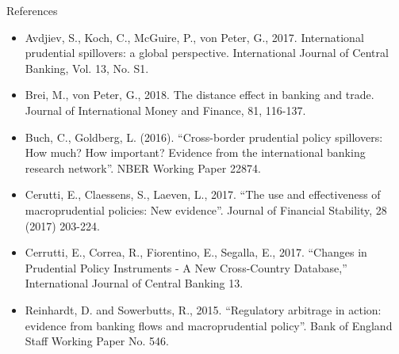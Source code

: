 \documentclass{beamer}
\begin{document}
\begin{frame}{References}
\begin{itemize}
\item Avdjiev, S., Koch, C., McGuire, P., von Peter, G., 2017. International prudential spillovers: a global perspective. International Journal of Central Banking, Vol. 13, No. S1.
\item Brei, M., von Peter, G., 2018. The distance effect in banking and trade. Journal of International Money and Finance, 81, 116-137.
\item Buch, C., Goldberg, L. (2016). “Cross-border prudential policy spillovers: How much? How important? Evidence from the international banking research network”. NBER Working Paper 22874.
\item Cerutti, E., Claessens, S., Laeven, L., 2017. “The use and effectiveness of macroprudential policies: New evidence”. Journal of Financial Stability, 28 (2017) 203-224.
\item Cerrutti, E., Correa, R., Fiorentino, E., Segalla, E., 2017. “Changes in Prudential Policy Instruments - A New Cross-Country Database,” International Journal of Central Banking 13.
\item Reinhardt, D. and Sowerbutts, R., 2015. “Regulatory arbitrage in action: evidence from banking flows and macroprudential policy”. Bank of England Staff Working Paper No. 546.
\end{itemize}
\end{frame}
\end{document}
